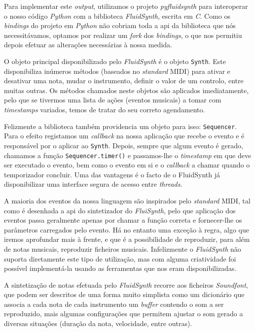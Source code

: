 Para implementar este \textit{output}, utilizamos o projeto \textit{pyfluidsynth}\citep{pyfluidsynth} para interoperar o nosso código \textit{Python} com a biblioteca \textit{FluidSynth}, escrita em \textit{C}. Como os \textit{bindings} do projeto em \textit{Python} não cobriam toda a \acrshort{api} da biblioteca que nós necessitávamos, optamos por realizar um \textit{fork} dos \textit{bindings}, o que nos permitiu depois efetuar as alterações necessárias à nossa medida.

O objeto principal disponibilizado pelo \textit{FluidSynth} é o objeto \texttt{Synth}. Este disponibiliza inúmeros métodos (baseados no \textit{standard} MIDI) para ativar e desativar uma nota, mudar o instrumento, definir o valor de um controlo, entre muitas outras. Os métodos chamados neste objetos são aplicados imediatamente, pelo que se tivermos uma lista de ações (eventos musicais) a tomar com \textit{timestamps} variados, temos de tratar do seu correto agendamento.

Felizmente a biblioteca também providencia um objeto para isso: \texttt{Sequencer}.  Para o efeito registamos um \textit{callback} na nossa aplicação que recebe o evento e é responsável por o aplicar ao \texttt{Synth}. Depois, sempre que algum evento é gerado, chamamos a função \texttt{Sequencer.timer()} e passamos-lhe o \textit{timestamp} em que deve ser executado o evento, bem como o evento em si e o \textit{callback} a chamar quando o temporizador concluir. Uma das vantagens é o facto de o FluidSynth já disponibilizar uma interface segura de acesso entre \textit{threads}\citep{henningsson2011fluidsynth}.

A maioria dos eventos da nossa linguagem são inspirados pelo \textit{standard} MIDI, tal como é desenhada a \acrshort{api} do sintetizador do \textit{FluiSynth}, pelo que aplicação dos eventos passa geralmente apenas por chamar a função correta e fornecer-lhe os parâmetros carregados pelo evento. Há no entanto uma exceção à regra, algo que iremos aprofundar mais à frente, e que é a possibilidade de reproduzir, para além de notas musicais, reproduzir ficheiros musicais. Infelizmente o \textit{FluidSynth} não suporta diretamente este tipo de utilização, mas com alguma criatividade foi possível implementá-la usando as ferramentas que nos eram disponibilizadas.

A sintetização de notas efetuada pelo \textit{FluidSynth} recorre aos ficheiros \textit{Soundfont}, que podem ser descritos de uma forma muito simplista como um dicionário que associa a cada nota de cada instrumento um \textit{buffer} contendo o som a ser reproduzido, mais algumas configurações que permitem ajustar o som gerado a diversas situações (duração da nota, velocidade, entre outras).

